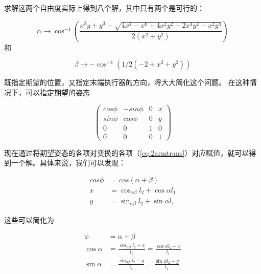 
求解这两个自由度实际上得到八个解，其中只有两个是可行的：

\begin{equation}
\alpha \rightarrow \cos^{-1}\left(\frac{x^2 y + y^3 - \sqrt{4 x^4 - x^6 + 4 x^2 y^2 - 2 x^4 y^2 - x^2 y^4}}{2 (x^2 + y^2)}\right)
\end{equation}
和

\begin{equation}
\beta \rightarrow -\cos^{-1}\left(1/2(-2+x^2+y^2)\right)
\end{equation}


既指定期望的位置，又指定末端执行器的方向，将大大简化这个问题。 在这种情况下，可以指定期望的姿态

\begin{equation}
\left(
\begin{array}{cccc}
cos\phi & -sin\phi & 0 & x\\
sin\phi & cos\phi & 0 & y\\
0 & 0 & 1 & 0\\
0 & 0 & 0 & 1
\end{array}
\right)
\end{equation}


现在通过将期望姿态的各项对变换的各项（\ref{eq:2armtrans}）对应赋值，就可以得到一个解。具体来说，我们可以发现：

\begin{eqnarray}
cos\phi &= cos(\alpha+\beta)\\
\nonumber
x &= \cos_{\alpha\beta}l_2+\cos\alpha l_1\\
\nonumber
y &= \sin_{\alpha\beta}l_2+\sin\alpha l_1
\end{eqnarray}

这些可以简化为

\begin{eqnarray}
\phi &= \alpha + \beta\\
\nonumber
\cos\alpha &= \frac{\cos_{\alpha\beta}l_2-x}{l_1}=\frac{\cos\phi l_2-x}{l_1}\\
\nonumber
\sin\alpha &= \frac{\sin_{\alpha\beta}l_2-y}{l_1}=\frac{\sin\phi l_2-y}{l_1}\\
\end{eqnarray}

